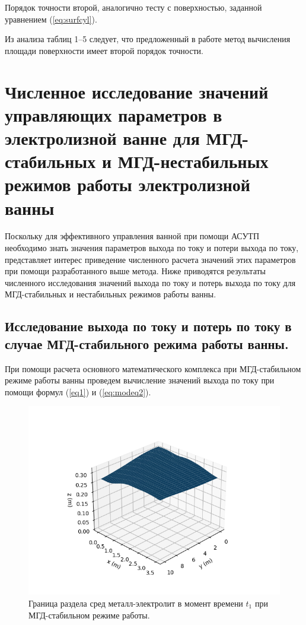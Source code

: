 \documentclass{article}
\begin{document}
Порядок точности второй, аналогично тесту с поверхностью, заданной уравнением (\ref{eq:surfcyl}).

Из анализа таблиц 1–5 следует, что предложенный в работе метод вычисления площади поверхности имеет второй порядок точности.

\section{Численное исследование значений управляющих параметров в электролизной ванне для МГД-стабильных и МГД-нестабильных режимов работы электролизной ванны}

Поскольку для эффективного управления ванной при помощи АСУТП необходимо знать значения параметров выхода по току и потери выхода по току, представляет интерес приведение численного расчета значений этих параметров при помощи разработанного выше метода. Ниже приводятся результаты численного исследования значений выхода по току и потерь выхода по току для МГД-стабильных и нестабильных режимов работы ванны.

\subsection{Исследование выхода по току и потерь по току в случае МГД-стабильного режима работы ванны.}

При помощи расчета основного математического комплекса при МГД-стабильном режиме работы ванны проведем вычисление значений выхода по току при помощи формул (\ref{eq1}) и (\ref{eq:modeq2}).

\begin{figure}[H]
\centering
\includegraphics[width=0.8\linewidth]{h.png}
\caption{Граница раздела сред металл-электролит в момент времени $t_1$ при МГД-стабильном режиме работы. \label{fig:hsurf}}
\end{figure}
\end{document}
